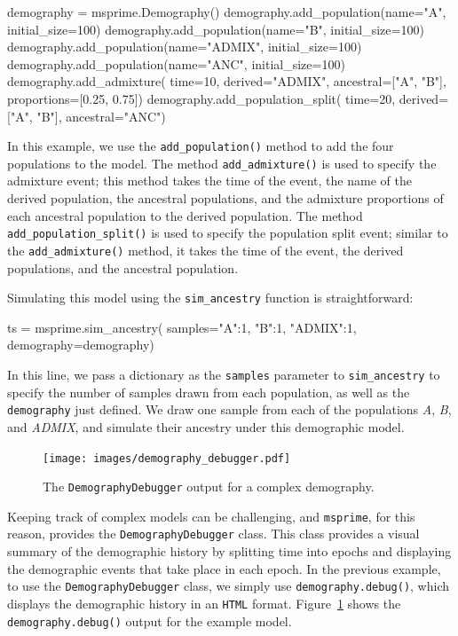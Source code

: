 \documentclass[graybox]{svmult}
\newcommand{\msprime}[0]{\texttt{msprime}}
\begin{document}
\begin{pythoncode}
    demography = msprime.Demography()
    demography.add_population(name="A", initial_size=100)
    demography.add_population(name="B", initial_size=100)
    demography.add_population(name="ADMIX", initial_size=100)
    demography.add_population(name="ANC", initial_size=100)
    demography.add_admixture(
        time=10, derived="ADMIX", ancestral=["A", "B"],
        proportions=[0.25, 0.75])
    demography.add_population_split(
        time=20, derived=["A", "B"], ancestral="ANC")
\end{pythoncode}

In this example, we use the \texttt{add\_population()} method to add the four populations
to the model. The method \texttt{add\_admixture()} is used to specify the admixture event;
this method takes the time of the event, the name of the derived population, the ancestral
populations, and the admixture proportions of each ancestral population to the derived population.
The method \texttt{add\_population\_split()} is used to specify the population split event;
similar to the \texttt{add\_admixture()} method, it takes the time of the event, the derived
populations, and the ancestral population.

Simulating this model using the \texttt{sim\_ancestry} function is straightforward:
\begin{pythoncode}
ts = msprime.sim_ancestry(
    samples={"A":1, "B":1, "ADMIX":1}, demography=demography)
\end{pythoncode}
In this line, we pass a dictionary as the \texttt{samples} parameter to \texttt{sim\_ancestry} to
specify the number of samples drawn from each population, as well as the
\texttt{demography} just defined.
We draw one sample from each of the populations
\emph{A}, \emph{B}, and \emph{ADMIX}, and simulate their ancestry under this
demographic model.

\begin{figure}[t]
\centering
\texttt{[image: images/demography\_debugger.pdf]}
\caption{\label{fig:DemographyDebugger}The \texttt{DemographyDebugger} output for a complex demography.}
\end{figure}

\label{demography-debugger}
Keeping track of complex models can be challenging, and \msprime, for this reason,
provides the \texttt{DemographyDebugger} class. This class provides a visual summary of
the demographic history by splitting time into epochs and displaying the demographic
events that take place in each epoch. In the previous example, to use the \texttt{DemographyDebugger} class,
we simply use \texttt{demography.debug()}, which displays the demographic history in an \texttt{HTML}
format. Figure~\ref{fig:DemographyDebugger} shows the \texttt{demography.debug()} output
for the example model.
\end{document}
